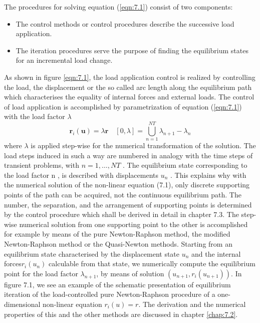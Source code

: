 The procedures for solving equation (\ref{eqn:7.1}) consist of two components:
\begin{itemize}
    \item The control methods or control procedures describe the successive load application.
    \item The iteration procedures serve the purpose of finding the equilibrium states for an incremental load change.
\end{itemize}
As shown in figure \ref{eqn:7.1}, the load application control is realized by controlling the load, the
displacement or the so called arc length along the equilibrium path which characterises the
equality of internal forces and external loads. The control of load application is accomplished
by parametrization of equation (\ref{eqn:7.1}) with the load factor $\lambda$
\begin{equation}
 \boldsymbol{r}_{i}(\boldsymbol{u})=\lambda \boldsymbol{r} \quad[0, \lambda]=\bigcup_{n=1}^{N T} \lambda_{n+1}-\lambda_{n} 
 \label{eqn:7.2} 
\end{equation}
where $\lambda$ is applied step-wise for the numerical transformation of the solution. The load steps induced in such a way are numbered in analogy with the time steps of transient problems, 
with $n = 1,\ldots, NT$ . The equilibrium state corresponding to the load factor \lambda n , is described with displacements $u_n$ . This explains why with the numerical solution of the non-linear
equation (7.1), only discrete supporting points of the path can be acquired, not the continuous
equilibrium path. The number, the separation, and the arrangement of supporting points
is determined by the control procedure which shall be derived in detail in chapter 7.3. The
step-wise numerical solution from one supporting point to the other is accomplished for example
by means of the pure Newton-Raphson method, the modified Newton-Raphson method
or the Quasi-Newton methods. Starting from an equilibrium state characterised by the
displacement state $u_n$ and the internal forces$ r _i (u_n ) $ calculable from that state, we numerically
compute the equilibrium point for the load factor $\lambda_{ n+1} $, by means of solution $(u_{n+1} , r_i (u_{n+1} ))$.
In figure 7.1, we see an example of the schematic presentation of equilibrium iteration of the
load-controlled pure Newton-Raphson procedure of a one-dimensional non-linear equation
$r_ i (u) = r$. The derivation and the numerical properties of this and the other methods are
discussed in chapter \ref{chap:7.2}.
